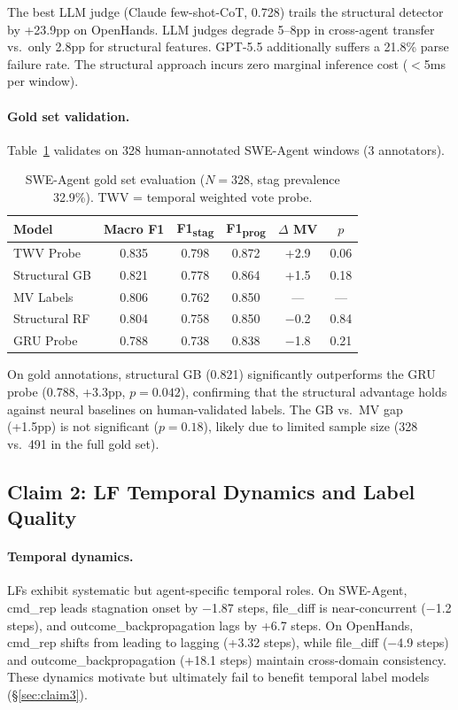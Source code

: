\documentclass[11pt,a4paper]{article}
\begin{document}
The best LLM judge (Claude few-shot-CoT, 0.728) trails the structural detector by +23.9pp on OpenHands. LLM judges degrade 5--8pp in cross-agent transfer vs.\ only 2.8pp for structural features. GPT-5.5 additionally suffers a 21.8\% parse failure rate. The structural approach incurs zero marginal inference cost ({$<$}5ms per window).

\paragraph{Gold set validation.}
Table~\ref{tab:gold} validates on 328 human-annotated SWE-Agent windows (3 annotators).

\begin{table}[t]
\centering
\small
\caption{SWE-Agent gold set evaluation ($N{=}328$, stag prevalence 32.9\%). TWV = temporal weighted vote probe.}
\label{tab:gold}
\begin{tabular}{lccccc}
\toprule
\textbf{Model} & \textbf{Macro F1} & \textbf{F1\textsubscript{stag}} & \textbf{F1\textsubscript{prog}} & \textbf{$\Delta$ MV} & \textbf{$p$} \\
\midrule
TWV Probe & 0.835 & 0.798 & 0.872 & +2.9 & 0.06 \\
Structural GB & 0.821 & 0.778 & 0.864 & +1.5 & 0.18 \\
MV Labels & 0.806 & 0.762 & 0.850 & --- & --- \\
Structural RF & 0.804 & 0.758 & 0.850 & $-$0.2 & 0.84 \\
GRU Probe & 0.788 & 0.738 & 0.838 & $-$1.8 & 0.21 \\
\bottomrule
\end{tabular}
\vspace{-2mm}
\end{table}

On gold annotations, structural GB (0.821) significantly outperforms the GRU probe (0.788, +3.3pp, $p{=}0.042$), confirming that the structural advantage holds against neural baselines on human-validated labels. The GB vs.\ MV gap (+1.5pp) is not significant ($p{=}0.18$), likely due to limited sample size (328 vs.\ 491 in the full gold set).

\subsection{Claim 2: LF Temporal Dynamics and Label Quality}
\label{sec:claim2}

\paragraph{Temporal dynamics.}
LFs exhibit systematic but agent-specific temporal roles. On SWE-Agent, cmd\_rep leads stagnation onset by $-$1.87 steps, file\_diff is near-concurrent ($-$1.2 steps), and outcome\_backpropagation lags by +6.7 steps. On OpenHands, cmd\_rep shifts from leading to lagging (+3.32 steps), while file\_diff ($-$4.9 steps) and outcome\_backpropagation (+18.1 steps) maintain cross-domain consistency. These dynamics motivate but ultimately fail to benefit temporal label models (\S\ref{sec:claim3}).
\end{document}
